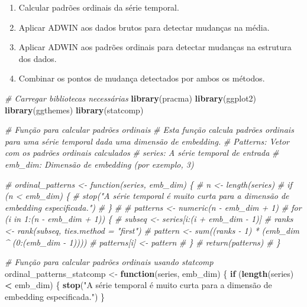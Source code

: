 \documentclass[
]{article}
\newenvironment{Shaded}{\begin{snugshade}}{\end{snugshade}}
\newcommand{\CommentTok}[1]{\textcolor[rgb]{0.56,0.35,0.01}{\textit{#1}}}
\newcommand{\ControlFlowTok}[1]{\textcolor[rgb]{0.13,0.29,0.53}{\textbf{#1}}}
\newcommand{\FunctionTok}[1]{\textcolor[rgb]{0.13,0.29,0.53}{\textbf{#1}}}
\newcommand{\NormalTok}[1]{#1}
\newcommand{\OtherTok}[1]{\textcolor[rgb]{0.56,0.35,0.01}{#1}}
\newcommand{\SpecialCharTok}[1]{\textcolor[rgb]{0.81,0.36,0.00}{\textbf{#1}}}
\newcommand{\StringTok}[1]{\textcolor[rgb]{0.31,0.60,0.02}{#1}}
\providecommand{\tightlist}{%
  \setlength{\itemsep}{0pt}\setlength{\parskip}{0pt}}
\begin{document}
\begin{enumerate}
\def\labelenumi{\arabic{enumi}.}
\tightlist
\item
  Calcular padrões ordinais da série temporal.
\item
  Aplicar ADWIN aos dados brutos para detectar mudanças na média.
\item
  Aplicar ADWIN aos padrões ordinais para detectar mudanças na estrutura
  dos dados.
\item
  Combinar os pontos de mudança detectados por ambos os métodos.
\end{enumerate}

\begin{Shaded}
\begin{Highlighting}[]
\CommentTok{\# Carregar bibliotecas necessárias}
\FunctionTok{library}\NormalTok{(pracma)}
\FunctionTok{library}\NormalTok{(ggplot2)}
\FunctionTok{library}\NormalTok{(ggthemes)}
\FunctionTok{library}\NormalTok{(statcomp)}

\CommentTok{\# Função para calcular padrões ordinais}
\CommentTok{\# Esta função calcula padrões ordinais para uma série temporal dada uma dimensão de embedding.}
\CommentTok{\# Patterns: Vetor com os padrões ordinais calculados}
\CommentTok{\# series: A série temporal de entrada}
\CommentTok{\# emb\_dim: Dimensão de embedding (por exemplo, 3)}

\CommentTok{\# ordinal\_patterns \textless{}{-} function(series, emb\_dim) \{}
\CommentTok{\#   n \textless{}{-} length(series)}
\CommentTok{\#   if (n \textless{} emb\_dim) \{}
\CommentTok{\#     stop("A série temporal é muito curta para a dimensão de embedding especificada.")}
\CommentTok{\#   \}}
\CommentTok{\#   }
\CommentTok{\#   patterns \textless{}{-} numeric(n {-} emb\_dim + 1)}
\CommentTok{\#   for (i in 1:(n {-} emb\_dim + 1)) \{}
\CommentTok{\#     subseq \textless{}{-} series[i:(i + emb\_dim {-} 1)]}
\CommentTok{\#     ranks \textless{}{-} rank(subseq, ties.method = "first")}
\CommentTok{\#     pattern \textless{}{-} sum((ranks {-} 1) * (emb\_dim \^{} (0:(emb\_dim {-} 1))))}
\CommentTok{\#     patterns[i] \textless{}{-} pattern}
\CommentTok{\#   \}}
\CommentTok{\#   return(patterns)}
\CommentTok{\# \}}

\CommentTok{\# Função para calcular padrões ordinais usando statcomp}
\NormalTok{ordinal\_patterns\_statcomp }\OtherTok{\textless{}{-}} \ControlFlowTok{function}\NormalTok{(series, emb\_dim) \{}
  \ControlFlowTok{if}\NormalTok{ (}\FunctionTok{length}\NormalTok{(series) }\SpecialCharTok{\textless{}}\NormalTok{ emb\_dim) \{}
    \FunctionTok{stop}\NormalTok{(}\StringTok{"A série temporal é muito curta para a dimensão de embedding especificada."}\NormalTok{)}
\NormalTok{  \}}
  

\end{Highlighting}
\end{Shaded}
\end{document}
